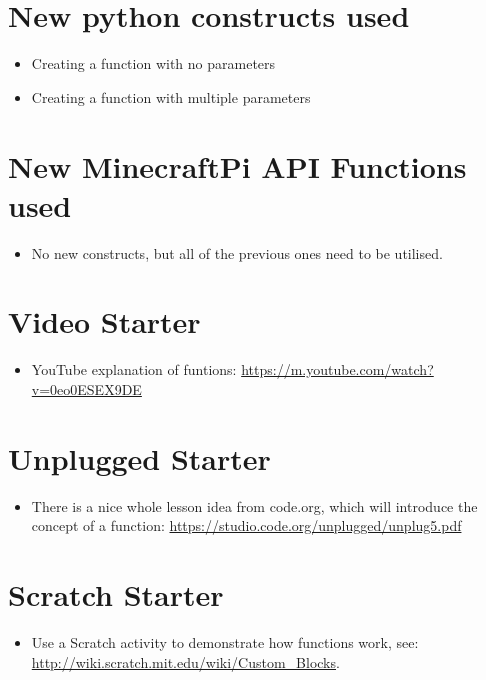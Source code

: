 \documentclass{geocraft-lesson-plan}
\begin{document}
\section*{New python constructs used}
\begin{itemize}
\item Creating a function with no parameters
\item Creating a function with multiple parameters
\end{itemize}

\section*{New MinecraftPi API Functions used}
\begin{itemize}
\item No new constructs, but all of the previous ones need to be utilised.
\end{itemize}

\section*{Video Starter}
\begin{itemize}
\item YouTube explanation of funtions: 
  {\textcolor{greenish}
    {\url{https://m.youtube.com/watch?v=0eo0ESEX9DE}}}
\end{itemize}

\section*{Unplugged Starter}
\begin{itemize}
\item There is a nice whole lesson idea from code.org, which will introduce the concept of a function:  
  {\textcolor{greenish}
    {\url{https://studio.code.org/unplugged/unplug5.pdf}}}
\end{itemize}

\section*{Scratch Starter}
\begin{itemize}
\item Use a Scratch activity to demonstrate how functions work, see:
  {\textcolor{greenish} {\url{http://wiki.scratch.mit.edu/wiki/Custom_Blocks}}}. 
\end{itemize}
\end{document}
